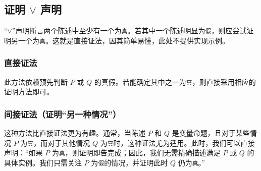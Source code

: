 
\subsection{证明 $\lor$ 声明}\label{sec:section4.9.3}

``$\lor$''声明断言两个陈述中至少有一个为\verb|真|。若其中一个陈述明显为\verb|假|，则应尝试证明另一个为\verb|真|。这就是直接证法，因其简单易懂，此处不提供实现示例。

\subsubsection*{直接证法}

\begin{center}
\noindent {}
\end{center}

此方法依赖预先判断 $P$ 或 $Q$ 的真假。若能确定其中之一为\verb|真|，则直接采用相应的证明方法即可。

\subsubsection*{间接证法（证明``另一种情况''）}

这种方法比直接证法更为有趣。通常，当陈述 $P$ 和 $Q$ 是变量命题，且对于某些情况 $P$ 为\verb|真|，而对于其他情况 $Q$ 为\verb|真|时，这种证法尤为适用。此时，我们可以直接声明：``如果 $P$ 为\verb|真|，则证明即告完成；因此，我们无需精确描述满足 $P$ 或 $Q$ 的具体实例。我们只需关注 $P$ 为\verb|假|的情况，并证明此时 $Q$ 仍为\verb|真|。''

\begin{center}
    \noindent {}
\end{center}

